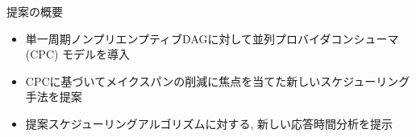 
\begin{frame}{提案の概要}
    \begin{itemize}
        \item 単一周期ノンプリエンプティブDAGに対して並列プロバイダコンシューマ (CPC) モデルを導入
        \item CPCに基づいてメイクスパンの削減に焦点を当てた新しいスケジューリング手法を提案
        \item 提案スケジューリングアルゴリズムに対する, 新しい応答時間分析を提示
    \end{itemize}
\end{frame}
